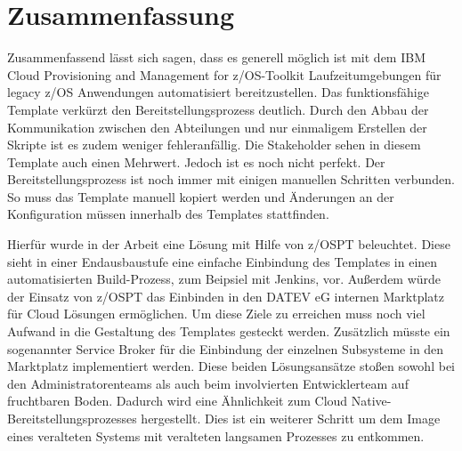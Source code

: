 \chapter{Zusammenfassung}\label{ch:zusammenfassung}
Zusammenfassend lässt sich sagen, dass es generell möglich ist mit dem \glqq IBM Cloud Provisioning and Management for z/OS\grqq-Toolkit Laufzeitumgebungen für legacy z/OS Anwendungen automatisiert bereitzustellen.
Das funktionsfähige Template verkürzt den Bereitstellungsprozess deutlich.
Durch den Abbau der Kommunikation zwischen den Abteilungen und nur einmaligem Erstellen der Skripte ist es zudem weniger fehleranfällig.
Die Stakeholder sehen in diesem Template auch einen Mehrwert.
Jedoch ist es noch nicht perfekt.
Der Bereitstellungsprozess ist noch immer mit einigen manuellen Schritten verbunden.
So muss das Template manuell kopiert werden und Änderungen an der Konfiguration müssen innerhalb des Templates stattfinden.

Hierfür wurde in der Arbeit eine Lösung mit Hilfe von z/OSPT beleuchtet.
Diese sieht in einer Endausbaustufe eine einfache Einbindung des Templates in einen automatisierten Build-Prozess, zum Beipsiel mit Jenkins, vor.
Außerdem würde der Einsatz von z/OSPT das Einbinden in den DATEV eG internen \glqq Marktplatz\grqq{} für Cloud Lösungen ermöglichen.
Um diese Ziele zu erreichen muss noch viel Aufwand in die Gestaltung des Templates gesteckt werden.
Zusätzlich müsste ein sogenannter \glqq Service Broker\grqq{} für die Einbindung der einzelnen Subsysteme in den \glqq Marktplatz\grqq{} implementiert werden.
Diese beiden Lösungsansätze stoßen sowohl bei den Administratorenteams als auch beim involvierten Entwicklerteam auf fruchtbaren Boden.
Dadurch wird eine Ähnlichkeit zum Cloud Native-Bereitstellungsprozesses hergestellt.
Dies ist ein weiterer Schritt um dem Image eines veralteten Systems mit veralteten langsamen Prozesses zu entkommen.  
